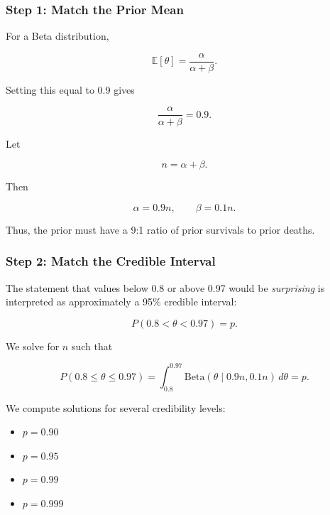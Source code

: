 \documentclass[
  letterpaper,
  DIV=11,
  numbers=noendperiod]{scrartcl}
\providecommand{\tightlist}{%
  \setlength{\itemsep}{0pt}\setlength{\parskip}{0pt}}\usepackage{longtable,booktabs,array}
\begin{document}
\subsubsection{Step 1: Match the Prior
Mean}\label{step-1-match-the-prior-mean}

For a Beta distribution,

\[
\mathbb{E}[\theta] = \frac{\alpha}{\alpha+\beta}.
\]

Setting this equal to 0.9 gives

\[
\frac{\alpha}{\alpha+\beta} = 0.9.
\]

Let

\[
n = \alpha + \beta.
\]

Then

\[
\alpha = 0.9n, 
\qquad 
\beta = 0.1n.
\]

Thus, the prior must have a 9:1 ratio of prior survivals to prior
deaths.

\subsubsection{Step 2: Match the Credible
Interval}\label{step-2-match-the-credible-interval}

The statement that values below 0.8 or above 0.97 would be
\emph{surprising} is interpreted as approximately a 95\% credible
interval:

\[
P(0.8 < \theta < 0.97) = p.
\]

We solve for \(n\) such that

\[
P(0.8\le \theta \le0.97)=\int_{0.8}^{0.97} 
\text{Beta}(\theta \mid 0.9n, 0.1n)\, d\theta = p.
\]

We compute solutions for several credibility levels:

\begin{itemize}
\tightlist
\item
  \(p = 0.90\)
\item
  \(p = 0.95\)
\item
  \(p = 0.99\)
\item
  \(p = 0.999\)
\end{itemize}
\end{document}
